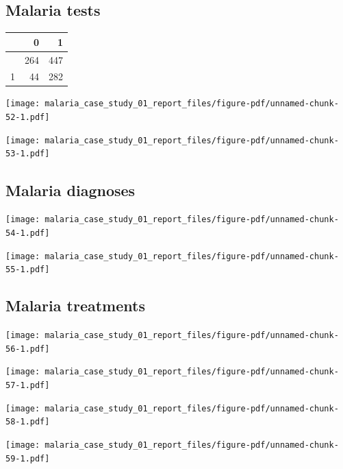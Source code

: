 \documentclass[
  letterpaper,
  DIV=11,
  numbers=noendperiod,
  oneside]{scrreprt}
\begin{document}
\hypertarget{malaria-tests-1}{%
\subsection{Malaria tests}\label{malaria-tests-1}}

\begin{longtable}[]{@{}lrr@{}}
\toprule\noalign{}
& 0 & 1 \\
\midrule\noalign{}
\endhead
\bottomrule\noalign{}
\endlastfoot
0 & 264 & 447 \\
1 & 44 & 282 \\
\end{longtable}

\texttt{[image: malaria\_case\_study\_01\_report\_files/figure-pdf/unnamed-chunk-52-1.pdf]}

\texttt{[image: malaria\_case\_study\_01\_report\_files/figure-pdf/unnamed-chunk-53-1.pdf]}

\hypertarget{malaria-diagnoses}{%
\subsection{Malaria diagnoses}\label{malaria-diagnoses}}

\texttt{[image: malaria\_case\_study\_01\_report\_files/figure-pdf/unnamed-chunk-54-1.pdf]}

\texttt{[image: malaria\_case\_study\_01\_report\_files/figure-pdf/unnamed-chunk-55-1.pdf]}

\hypertarget{malaria-treatments-1}{%
\subsection{Malaria treatments}\label{malaria-treatments-1}}

\texttt{[image: malaria\_case\_study\_01\_report\_files/figure-pdf/unnamed-chunk-56-1.pdf]}

\texttt{[image: malaria\_case\_study\_01\_report\_files/figure-pdf/unnamed-chunk-57-1.pdf]}

\texttt{[image: malaria\_case\_study\_01\_report\_files/figure-pdf/unnamed-chunk-58-1.pdf]}

\texttt{[image: malaria\_case\_study\_01\_report\_files/figure-pdf/unnamed-chunk-59-1.pdf]}
\end{document}
